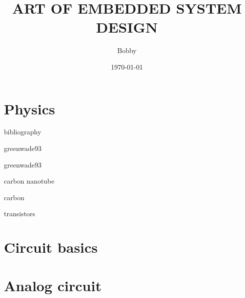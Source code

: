 \documentclass[UTF8]{book}
\title{ART OF EMBEDDED SYSTEM DESIGN }
\author{Bobby}
\date{\today}
\begin{document}
	\maketitle
	\frontmatter
	

	\tableofcontents
	
	\mainmatter
	\part{Physics}
	\label{Physics}
	

	\begin{comment} 
	\chapter{Solid state physics}
	\label{Solid state physics}
	\chapter{Semiconductor physics}
	\label{Semiconductor physics}
	\end{comment}


	bibliography
	
	greenwade93\cite{greenwade93}

	greenwade93\cite{Xarticle}

	carbon nanotube\cite{dreyer2010chemistry}

	carbon\cite{geim2007rise}

	transistors\cite{novoselov2005two}

	
	
	\part{Circuit basics}
	\label{Circuit basics}
	
	
	\part{Analog circuit}
	\label{Analog circuit}
	
	\begin{comment} 
	rather stupid, but helpful 
	\chapter{Transistor circuit analysis}
	\label{Transistor circuit analysis}
	\chapter{Transistor circuit design}
	\label{Transistor circuit design}
	\chapter{FET circuit analysis}
	\label{FET circuit analysis}
	\chapter{FET circuit design}
	\label{FET circuit design}
	\end{comment}
	
\end{document}
